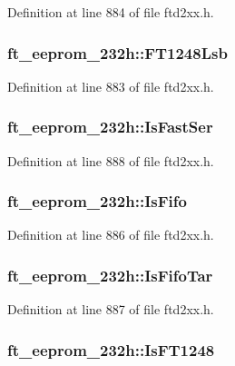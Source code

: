 Definition at line 884 of file ftd2xx.h.\hypertarget{structft__eeprom__232h_a8c3cb15f176eaaad39fddedcae8ab10d}{
\subsubsection[{FT1248Lsb}]{ {\bf ft\_\-eeprom\_\-232h::FT1248Lsb}}}
\label{structft__eeprom__232h_a8c3cb15f176eaaad39fddedcae8ab10d}


Definition at line 883 of file ftd2xx.h.\hypertarget{structft__eeprom__232h_ad214d1fe4bf5bf916c5364777f9dc1a8}{
\subsubsection[{IsFastSer}]{ {\bf ft\_\-eeprom\_\-232h::IsFastSer}}}
\label{structft__eeprom__232h_ad214d1fe4bf5bf916c5364777f9dc1a8}


Definition at line 888 of file ftd2xx.h.\hypertarget{structft__eeprom__232h_a5b6fa725478fe8f58ef4aa232ff4f6c4}{
\subsubsection[{IsFifo}]{ {\bf ft\_\-eeprom\_\-232h::IsFifo}}}
\label{structft__eeprom__232h_a5b6fa725478fe8f58ef4aa232ff4f6c4}


Definition at line 886 of file ftd2xx.h.\hypertarget{structft__eeprom__232h_a73d9b80c5b4c07b2085deeb4689b4371}{
\subsubsection[{IsFifoTar}]{ {\bf ft\_\-eeprom\_\-232h::IsFifoTar}}}
\label{structft__eeprom__232h_a73d9b80c5b4c07b2085deeb4689b4371}


Definition at line 887 of file ftd2xx.h.\hypertarget{structft__eeprom__232h_aa2b426719debc007b4ce6166524ca68f}{
\subsubsection[{IsFT1248}]{ {\bf ft\_\-eeprom\_\-232h::IsFT1248}}}
\label{structft__eeprom__232h_aa2b426719debc007b4ce6166524ca68f}


